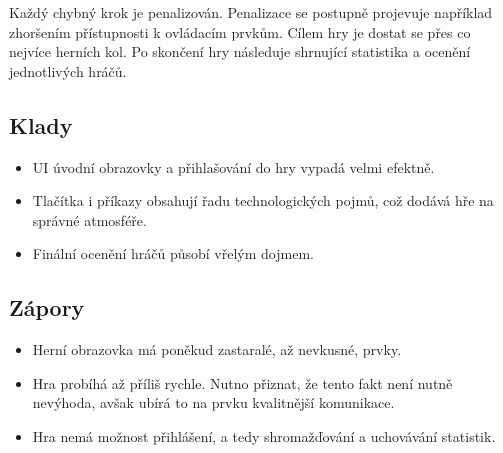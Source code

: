Každý chybný krok je penalizován.
Penalizace se postupně projevuje například zhoršením přístupnosti k ovládacím
prvkům.
Cílem hry je dostat se přes co nejvíce herních kol.
Po skončení hry následuje shrnující statistika a ocenění jednotlivých hráčů.

\subsection*{Klady}

\begin{itemize}
    \item UI úvodní obrazovky a přihlašování do hry vypadá velmi efektně.
    \item Tlačítka i příkazy obsahují řadu technologických pojmů,
    což dodává hře na správné atmosféře.
    \item Finální ocenění hráčů působí vřelým dojmem.
\end{itemize}

\subsection*{Zápory}

\begin{itemize}
    \item Herní obrazovka má poněkud zastaralé, až nevkusné, prvky.
    \item Hra probíhá až příliš rychle.
    Nutno přiznat, že tento fakt není nutně nevýhoda,
    avšak ubírá to na prvku kvalitnější komunikace.
    \item Hra nemá možnost přihlášení,
    a tedy shromažďování a uchovávání statistik.
\end{itemize}
